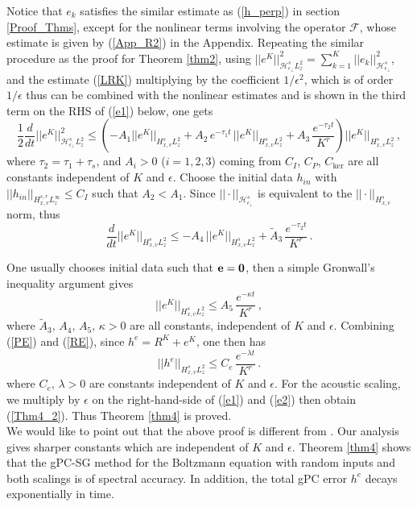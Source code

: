 \documentclass[final,onefignum,onetabnum]{siamart171218}
\begin{document}
Notice that $e_k$ satisfies the similar estimate as (\ref{h_perp}) in section \ref{Proof_Thms}, except for the nonlinear terms involving the 
operator $\mathcal F$, whose estimate is given by (\ref{App_R2}) in the Appendix. 
Repeating the similar procedure as the proof for Theorem \ref{thm2}, using $ ||e^K||_{\mathcal H_{\epsilon_{\perp}}^s L_z^2}^2 
= \sum_{k=1}^{K} ||e_k||_{\mathcal H_{\epsilon_{\perp}}^s}^2$,  
and the estimate (\ref{LRK}) multiplying by the coefficient $1/\epsilon^2$, which is of order $1/\epsilon$ thus can be combined with the 
nonlinear estimates and is shown in the third term on the RHS of (\ref{e1}) below, 
one gets  
\begin{equation}
\label{e1}
\frac{1}{2}\frac{d}{dt}||e^K||_{\mathcal H_{\epsilon_{\perp}}^s L_z^2}^2
 \leq\left( -A_1 ||e^K||_{H^s_{x,v}L_z^2} + A_2\, e^{-\tau_1 t}\,
||e^K||_{H^s_{x,v}L_z^2} + A_3\, \frac{e^{-\tau_2 t}}{K^{r}}\right) ||e^K||_{H^s_{x,v}L_z^2}\,, \end{equation}
where
$\tau_2 = \tau_1 + \tau_s$, and $A_i>0$ ($i=1,2,3$) coming from $C_I$, $C_P$, $C_{\text{ker}}$
are all constants independent of $K$ and $\epsilon$. 
Choose the initial data $h_{in}$ with $||h_{in}||_{H_{x,v}^{s,r}L_z^{\infty}}\leq C_I$ such that $A_2<A_1$.
Since $||\cdot||_{\mathcal H_{\epsilon_{\perp}}^s}$ is equivalent to the $||\cdot||_{H^s_{x,v}}$ norm, thus
\begin{equation}\label{e2} 
\frac{d}{dt} ||e^K||_{H^s_{x,v}L_z^2} \leq - A_4\,  ||e^K||_{H^s_{x,v}L_z^2} + \widetilde A_3\, \frac{e^{-\tau_2 t}}{K^{r}}\,. 
\end{equation}

One usually chooses initial data such that ${\bf e}={\bf 0}$, then a simple Gronwall's inequality argument gives
\begin{equation}\label{RE} ||e^K||_{H^s_{x,v}L_z^2} \leq A_5\, \frac{e^{-\kappa t}}{K^{r}}\,,   \end{equation}
where $\widetilde A_3, \, A_4, \, A_5, \, \kappa>0$ are all constants, independent of $K$ and $\epsilon$. 
Combining (\ref{PE}) and (\ref{RE}), since $h^e=R^K + e^K$, one then has
$$ ||h^e||_{H_{x,v}^{s} L_z^2} \leq C_{e}\, \frac{e^{-\lambda t}}{K^r}\,. $$
where $C_e, \, \lambda>0$ are constants independent of $K$ and $\epsilon$. 
For the acoustic scaling, we multiply by $\epsilon$ on the right-hand-side of
(\ref{e1}) and (\ref{e2}) then obtain (\ref{Thm4_2}). Thus Theorem \ref{thm4} is proved.  \\[1pt]

We would like to point out that the above proof is different from \cite{Hu}. 
Our analysis gives sharper constants which are independent of $K$ and $\epsilon$. 
Theorem \ref{thm4} shows that the gPC-SG method for the Boltzmann equation with random inputs and both scalings is of spectral accuracy.
In addition, the total gPC error $h^e$ decays exponentially in time.
\end{document}
